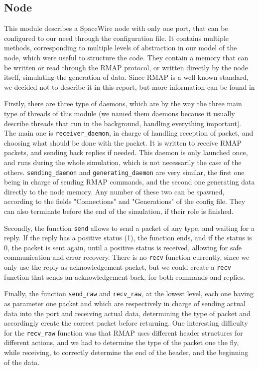 \documentclass[12pt,a4paper]{article}
\begin{document}
\subsection{Node}
\label{ssec:Node}
This module describes a SpaceWire node with only one port, that can be configured to our need through the configuration file. It contains multiple methods, corresponding to multiple levels of abstraction in our model of the node, which were useful to structure the code. They contain a memory that can be written or read through the RMAP protocol, or written directly by the node itself, simulating the generation of data. Since RMAP is a well known standard, we decided not to describe it in this report, but more information can be found in \cite{RMAP}\medbreak

Firstly, there are three type of daemons, which are by the way the three main type of threads of this module (we named them daemons because it usually describe threads that run in the background, handling everything important). The main one is \texttt{receiver\_daemon}, in charge of handling reception of packet, and choosing what should be done with the packet. It is written to receive RMAP packets, and sending back replies if needed. This daemon is only launched once, and runs during the whole simulation, which is not necessarily the case of the others. \texttt{sending\_daemon} and \texttt{generating\_daemon} are very similar, the first one being in charge of sending RMAP commands, and the second one generating data directly to the node memory. Any number of these two can be spawned, according to the fields "Connections" and "Generations" of the config file. They can also terminate before the end of the simulation, if their role is finished.

Secondly, the function \texttt{send} allows to send a packet of any type, and waiting for a reply. If the reply has a positive status (1), the function ends, and if the status is 0, the packet is sent again, until a positive status is received, allowing for safe communication and error recovery. There is no \texttt{recv} function currently, since we only use the reply as acknowledgement packet, but we could create a \texttt{recv} function that sends an acknowledgement back, for both commands and replies.

Finally, the function \texttt{send\_raw} and \texttt{recv\_raw}, at the lowest level, each one having as parameter one packet and which are respectively in charge of sending actual data into the port and receiving actual data, determining the type of packet and accordingly create the correct packet before returning. One interesting difficulty for the \texttt{recv\_raw} function was that RMAP uses different header structures for different actions, and we had to determine the type of the packet one the fly, while receiving, to correctly determine the end of the header, and the beginning of the data.\medbreak
\end{document}
